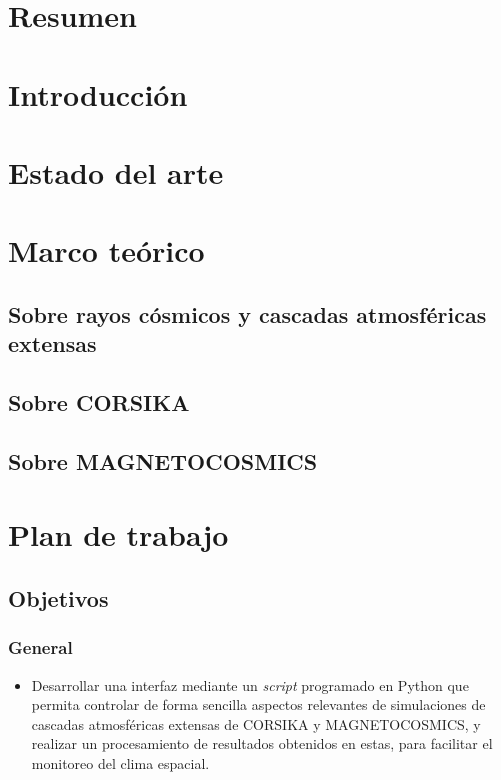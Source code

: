 \documentclass{report}
\begin{document}

\section*{Resumen}


\section*{Introducción}



\section*{Estado del arte}




\section*{Marco teórico}

\subsection*{Sobre rayos cósmicos y cascadas atmosféricas extensas}


\subsection*{Sobre CORSIKA}


\subsection*{Sobre MAGNETOCOSMICS}

\section*{Plan de trabajo}

\subsection*{Objetivos}

\subsubsection*{General}
\begin{itemize}
    \item Desarrollar una interfaz mediante un \textit{script} programado en Python que permita controlar de forma sencilla aspectos relevantes de simulaciones de cascadas atmosféricas extensas de CORSIKA y MAGNETOCOSMICS, y realizar un procesamiento de resultados obtenidos en estas, para facilitar el monitoreo del clima espacial.
\end{itemize}
\end{document}
